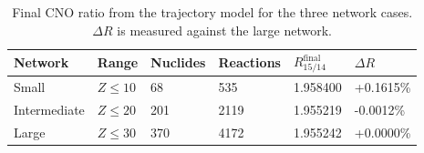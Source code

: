 \begin{table}[h!]
\centering
\caption{Final CNO ratio from the trajectory model for the three network cases. $\Delta R$ is measured against the large network.}
\begin{tabular}{llllll}
\hline
Network & Range & Nuclides & Reactions & $R^{\mathrm{final}}_{15/14}$ & $\Delta R$ \\
\hline
Small & $Z\leq10$ & 68 & 535 & 1.958400 & +0.1615\% \\
Intermediate & $Z\leq20$ & 201 & 2119 & 1.955219 & -0.0012\% \\
Large & $Z\leq30$ & 370 & 4172 & 1.955242 & +0.0000\% \\
\hline
\end{tabular}
\label{tab:nucnetpy_network_size}
\end{table}
